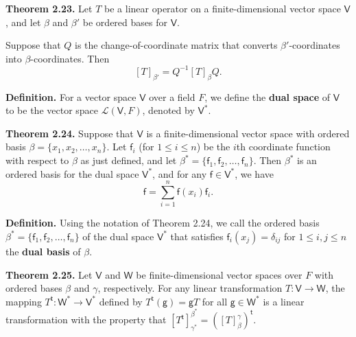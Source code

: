 \documentclass{article}
\newcommand{\0}{\mathit{0}}
\begin{document}
\textbf{Theorem 2.23.} Let $T$ be a linear operator on a finite-dimensional vector
space $\mathsf{V}$, and let $\beta$ and $\beta'$ be ordered bases for $\mathsf{V}$.

Suppose that $Q$ is the change-of-coordinate matrix that converts
$\beta'$-coordinates into $\beta$-coordinates. Then
\[
    \left[ T \right]_{\beta'} = Q^{-1} \left[ T \right]_{\beta} Q.
\]


\medskip

\textbf{Definition.} For a vector space $\mathsf{V}$ over a field $F$, we define the 
\textbf{dual space} of $\mathsf{V}$ to be the vector space $\mathcal{L}(\mathsf{V}, F)$, 
denoted by $\mathsf{V}^*$.

\medskip

\textbf{Theorem 2.24.} Suppose that $\mathsf{V}$ is a finite-dimensional vector space with 
ordered basis $\beta = \{x_1, x_2, \dots, x_n\}$. Let $\mathsf{f}_i$ (for $1 \leq i \leq n$) be the 
$i$th coordinate function with respect to $\beta$ as just defined, and let 
$\beta^* = \{\mathsf{f}_1, \mathsf{f}_2, \dots, \mathsf{f}_n\}$. 
Then $\beta^*$ is an ordered basis for the dual space $\mathsf{V}^*$, and for any 
$\mathsf{f} \in \mathsf{V}^*$, we have
\[
\mathsf{f} = \sum_{i=1}^{n} \mathsf{f}(x_i)\mathsf{f}_i.
\]

\medskip

\textbf{Definition.} Using the notation of Theorem 2.24, we call the ordered basis 
$\beta^* = \{\mathsf{f}_1, \mathsf{f}_2, \dots, \mathsf{f}_n\}$ of the dual space $\mathsf{V}^*$ that satisfies 
$\mathsf{f}_i(x_j) = \delta_{ij}$ for $1 \leq i, j \leq n$ the \textbf{dual basis} of $\beta$.

\medskip

\textbf{Theorem 2.25.} Let $\mathsf{V}$ and $\mathsf{W}$ be finite-dimensional vector spaces over 
$F$ with ordered bases $\beta$ and $\gamma$, respectively. For any linear transformation 
$T: \mathsf{V} \to \mathsf{W}$, the mapping 
$T^{\mathsf{t}} : \mathsf{W}^* \to \mathsf{V}^*$ 
defined by $T^{\mathsf{t}}(\mathsf{g}) = \mathsf{g}T$ for all $\mathsf{g} \in \mathsf{W}^*$ 
is a linear transformation with the property that 
\(
\left[ T^{\mathsf{t}} \right]^{\beta^*}_{\gamma^*} = \left( \left[ T \right]^\gamma_\beta \right)^{\mathsf{t}}.
\)
\end{document}

